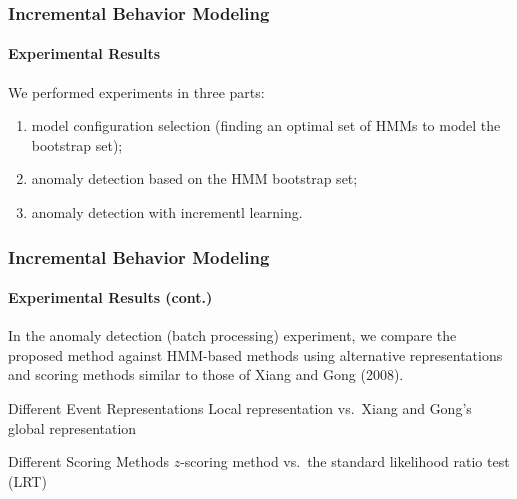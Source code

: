 
\begin{frame}
    \frametitle{Incremental Behavior Modeling}
    \framesubtitle{Experimental Results}

    We performed experiments in three parts:
    \begin{enumerate}
        \item model configuration selection (finding an optimal 
            set of HMMs to model the bootstrap set); 
        \item anomaly detection based on the HMM bootstrap set; 
        \item anomaly detection with incrementl learning.
    \end{enumerate}

\end{frame}


\begin{frame}
    \frametitle{Incremental Behavior Modeling}
    \framesubtitle{Experimental Results (cont.)}

    In the anomaly detection (batch processing) experiment, we compare 
    the proposed method against HMM-based methods using alternative 
    representations and scoring methods similar to those of Xiang and 
    Gong (2008).

    \medskip

    \begin{block}{Different Event Representations}
        Local representation vs.\ Xiang and Gong's global 
        representation
    \end{block}
    
    \begin{block}{Different Scoring Methods}
        $z$-scoring method vs.\ the standard likelihood ratio 
        test (LRT)
    \end{block}


\end{frame}


